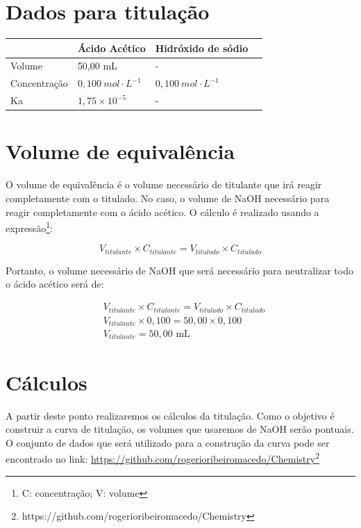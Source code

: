 \documentclass[a4paper, 12pt]{article}
\begin{document}
\section{Dados para titulação}

\begin{table}[H]
	\begin{center}
		\begin{tabular}{lp{5cm}lp{10cm}}\toprule
			& \textbf{Ácido Acético} & \textbf{Hidróxido de sódio} \\ \midrule			
			Volume & 50,00 mL & - \\ 
			Concentração & $0,100 \: mol \cdot L^{-1}$ & $0,100 \: mol \cdot L^{-1}$ \\ 
			Ka & $1,75 \times 10^{-5}$ & - \\
			\bottomrule
		\end{tabular}
	\end{center}
\end{table}

\section{Volume de equivalência}
O volume de equivalência é o volume necessário de titulante que irá reagir completamente com o titulado. No caso, o volume de NaOH necessário para reagir completamente com o ácido acético. O cálculo é realizado usando a expressão\footnote{C: concentração; V: volume}:

\begin{equation*}
	V_{titulante} \times C_{titulante} = V_{titulado} \times C_{titulado}
\end{equation*}

Portanto, o volume necessário de NaOH que será necessário para neutralizar todo o ácido acético será de:
\begin{fleqn}
\begin{align*}
	& V_{titulante} \times C_{titulante} = V_{titulado} \times C_{titulado} \\
	& V_{titulante} \times 0,100 = 50,00 \times 0,100 \\
	& V_{titulante} = 50,00 \text{ mL}
\end{align*}
\end{fleqn}

\section{Cálculos}
A partir deste ponto realizaremos os cálculos da titulação. Como o objetivo é construir a curva de titulação, os volumes que usaremos de NaOH serão pontuais. O conjunto de dados que será utilizado para a construção da curva pode ser encontrado no link: \href{https://github.com/rogerioribeiromacedo}{https://github.com/rogerioribeiromacedo/Chemistry}\footnote{https://github.com/rogerioribeiromacedo/Chemistry}
\end{document}
